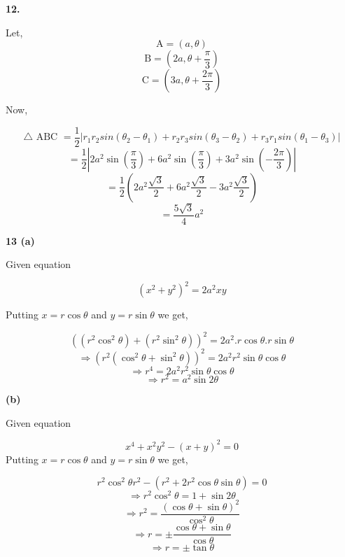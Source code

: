 \documentclass{article}
\begin{document}
\begin{flushleft}
\textbf{12. }\par
\vspace{0.5cm}
Let,
\[\text{A}=(a , \theta)\]
\[\text{B}=(2a , \theta+\frac{\pi}{3})\]
\[\text{C}=(3a , \theta+\frac{2\pi}{3})\]\par
Now,\par
\[\text{$\triangle$ ABC }=\frac{1}{2}|r_1 r_2 sin (\theta_2 -\theta_1)+r_2 r_3 sin (\theta_3 -\theta_2)+r_3 r_1 sin (\theta_1 -\theta_3)|\]
\[=\frac{1}{2}|2a^{2}\sin{(\frac{\pi}{3})}+6a^{2}\sin{(\frac{\pi}{3})}+3a^{2}\sin{(-\frac{2\pi}{3})}|\]
\[=\frac{1}{2}(2a^{2}\frac{\sqrt{3}}{2}+6a^{2}\frac{\sqrt{3}}{2}-3a^{2}\frac{\sqrt{3}}{2})\]
\[=\frac{5\sqrt{3}}{4}a^{2}\]\par
\vspace{1cm}

\textbf{13 \hspace{0.4cm}(a)}\par
\vspace{0.5cm}
Given equation\par
\[(x^{2}+y^{2})^{2}=2a^{2}xy\]\par
Putting $x = r \cos \theta $ and $y = r \sin \theta$ we get,\par
\[((r^{2} \cos^{2}\theta)+(r^{2} \sin^{2}\theta))^{2} = 2 a^{2}. r \cos{\theta} . r \sin{\theta}\]
\[\Longrightarrow (r^{2}(\cos^{2}{\theta} + \sin^{2}{\theta}))^{2} = 2a^{2}r^{2} \sin{\theta}\cos{\theta}\]
\[\Longrightarrow r^{4} = 2 a^{2}r^{2} \sin{\theta}\cos{\theta}\]
\[\Longrightarrow r^{2} = a^{2} \sin{2\theta}\]\par
\vspace{1cm}
\textbf{\hspace{1cm}(b)}\par
\vspace{0.5cm}
Given equation\par
\[x^4 + x^2y^2 - (x+y)^2 = 0\]
Putting $x = r \cos \theta $ and $y = r \sin \theta$ we get,\par
\[r^{2} \cos^{2}\theta r^{2} - (r^{2}+2r^{2} \cos\theta \sin\theta) = 0\]
\[\Longrightarrow r^{2} \cos^{2}\theta = 1 + \sin{2\theta}\]
\[\Longrightarrow r^{2}=\frac{(\cos\theta + \sin \theta)^{2}}{\cos^{2}\theta}\]
\[\Longrightarrow r = \pm \frac{\cos \theta + \sin \theta}{\cos \theta}\]
\[\Longrightarrow r = \pm \tan{\theta}\]\par
\newpage


\end{flushleft}
\end{document}
